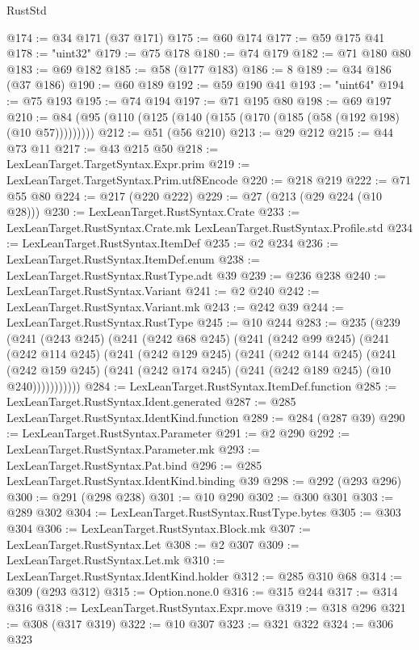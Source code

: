 \begin{lexlean}{RustStd}
\begin{coremodule}
@174 := @34 @171 (@37 @171)
@175 := @60 @174
@177 := @59 @175 @41
@178 := "uint32"
@179 := @75 @178
@180 := @74 @179
@182 := @71 @180 @80
@183 := @69 @182
@185 := @58 (@177 @183)
@186 := 8
@189 := @34 @186 (@37 @186)
@190 := @60 @189
@192 := @59 @190 @41
@193 := "uint64"
@194 := @75 @193
@195 := @74 @194
@197 := @71 @195 @80
@198 := @69 @197
@210 := @84 (@95 (@110 (@125 (@140 (@155 (@170 (@185 (@58 (@192 @198) (@10 @57)))))))))
@212 := @51 (@56 @210)
@213 := @29 @212
@215 := @44 @73 @11
@217 := @43 @215 @50
@218 := LexLeanTarget.TargetSyntax.Expr.prim
@219 := LexLeanTarget.TargetSyntax.Prim.utf8Encode
@220 := @218 @219
@222 := @71 @55 @80
@224 := @217 (@220 @222)
@229 := @27 (@213 (@29 @224 (@10 @28)))
@230 := LexLeanTarget.RustSyntax.Crate
@233 := LexLeanTarget.RustSyntax.Crate.mk LexLeanTarget.RustSyntax.Profile.std
@234 := LexLeanTarget.RustSyntax.ItemDef
@235 := @2 @234
@236 := LexLeanTarget.RustSyntax.ItemDef.enum
@238 := LexLeanTarget.RustSyntax.RustType.adt @39
@239 := @236 @238
@240 := LexLeanTarget.RustSyntax.Variant
@241 := @2 @240
@242 := LexLeanTarget.RustSyntax.Variant.mk
@243 := @242 @39
@244 := LexLeanTarget.RustSyntax.RustType
@245 := @10 @244
@283 := @235
    (@239
      (@241
        (@243 @245)
        (@241
          (@242 @68 @245)
          (@241
            (@242 @99 @245)
            (@241
              (@242 @114 @245)
              (@241
                (@242 @129 @245)
                (@241
                  (@242 @144 @245)
                  (@241
                    (@242 @159 @245)
                    (@241 (@242 @174 @245) (@241 (@242 @189 @245) (@10 @240)))))))))))
@284 := LexLeanTarget.RustSyntax.ItemDef.function
@285 := LexLeanTarget.RustSyntax.Ident.generated
@287 := @285 LexLeanTarget.RustSyntax.IdentKind.function
@289 := @284 (@287 @39)
@290 := LexLeanTarget.RustSyntax.Parameter
@291 := @2 @290
@292 := LexLeanTarget.RustSyntax.Parameter.mk
@293 := LexLeanTarget.RustSyntax.Pat.bind
@296 := @285 LexLeanTarget.RustSyntax.IdentKind.binding @39
@298 := @292 (@293 @296)
@300 := @291 (@298 @238)
@301 := @10 @290
@302 := @300 @301
@303 := @289 @302
@304 := LexLeanTarget.RustSyntax.RustType.bytes
@305 := @303 @304
@306 := LexLeanTarget.RustSyntax.Block.mk
@307 := LexLeanTarget.RustSyntax.Let
@308 := @2 @307
@309 := LexLeanTarget.RustSyntax.Let.mk
@310 := LexLeanTarget.RustSyntax.IdentKind.holder
@312 := @285 @310 @68
@314 := @309 (@293 @312)
@315 := Option.none.{0}
@316 := @315 @244
@317 := @314 @316
@318 := LexLeanTarget.RustSyntax.Expr.move
@319 := @318 @296
@321 := @308 (@317 @319)
@322 := @10 @307
@323 := @321 @322
@324 := @306 @323

\end{coremodule}
\end{lexlean}
